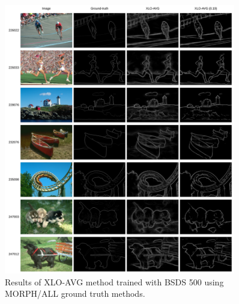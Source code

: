 

\begin{figure}%
  \centering
  \includegraphics[width=0.9\textwidth]{../imagens/apendice/appendix-horiz-09_v2.png}
  \caption{Results of XLO-AVG method trained with BSDS 500 using MORPH/ALL ground truth methods.}
  \label{fig:cap6_expr5_bsds_visual}
\end{figure}


